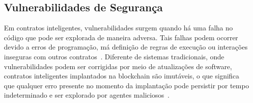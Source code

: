 \documentclass[12pt]{article}
\begin{document}


\subsection{Vulnerabilidades de Segurança}\label{subsec:vulnerabilities}

Em contratos inteligentes, vulnerabilidades surgem quando há uma falha no código que pode ser explorada de maneira adversa. Tais falhas podem ocorrer devido a erros de programação, má definição de regras de execução ou interações inseguras com outros contratos~\cite{nethermind2025}. Diferente de sistemas tradicionais, onde vulnerabilidades podem ser corrigidas por meio de atualizações de software, contratos inteligentes implantados na blockchain são imutáveis, o que significa que qualquer erro presente no momento da implantação pode persistir por tempo indeterminado e ser explorado por agentes maliciosos~\cite{kushwaha2022systematic}.


\end{document}
